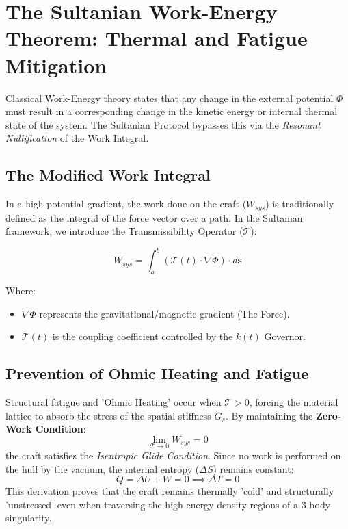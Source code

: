 \documentclass[11pt]{article}
\begin{document}
\section{The Sultanian Work-Energy Theorem: Thermal and Fatigue Mitigation}

Classical Work-Energy theory states that any change in the external potential $\Phi$ must result in a corresponding change in the kinetic energy or internal thermal state of the system. The Sultanian Protocol bypasses this via the \textit{Resonant Nullification} of the Work Integral.

\subsection{The Modified Work Integral}
In a high-potential gradient, the work done on the craft ($W_{sys}$) is traditionally defined as the integral of the force vector over a path. In the Sultanian framework, we introduce the Transmissibility Operator ($\mathcal{T}$):

\begin{equation}
    W_{sys} = \int_{a}^{b} \left( \mathcal{T}(t) \cdot \nabla \Phi \right) \cdot d\mathbf{s}
\end{equation}

Where:
\begin{itemize}
    \item $\nabla \Phi$ represents the gravitational/magnetic gradient (The Force).
    \item $\mathcal{T}(t)$ is the coupling coefficient controlled by the $k(t)$ Governor.
\end{itemize}

\subsection{Prevention of Ohmic Heating and Fatigue}
Structural fatigue and 'Ohmic Heating' occur when $\mathcal{T} > 0$, forcing the material lattice to absorb the stress of the spatial stiffness $G_s$. By maintaining the \textbf{Zero-Work Condition}:
\begin{equation}
    \lim_{\mathcal{T} \to 0} W_{sys} = 0
\end{equation}
the craft satisfies the \textit{Isentropic Glide Condition}. Since no work is performed on the hull by the vacuum, the internal entropy ($\Delta S$) remains constant:
\begin{equation}
    Q = \Delta U + W = 0 \implies \Delta T = 0
\end{equation}
This derivation proves that the craft remains thermally 'cold' and structurally 'unstressed' even when traversing the high-energy density regions of a 3-body singularity.
\end{document}
